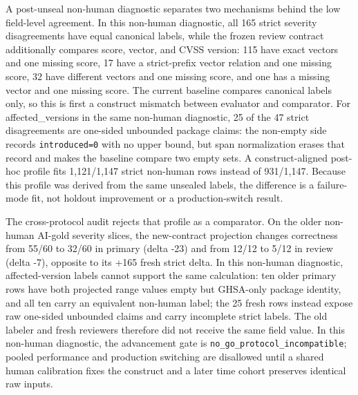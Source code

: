 A post-unseal non-human diagnostic separates two mechanisms behind the low field-level agreement. In this non-human diagnostic, all 165 strict severity disagreements have equal canonical labels, while the frozen review contract additionally compares score, vector, and CVSS version: 115 have exact vectors and one missing score, 17 have a strict-prefix vector relation and one missing score, 32 have different vectors and one missing score, and one has a missing vector and one missing score. The current baseline compares canonical labels only, so this is first a construct mismatch between evaluator and comparator. For affected\_versions in the same non-human diagnostic, 25 of the 47 strict disagreements are one-sided unbounded package claims: the non-empty side records \texttt{introduced=0} with no upper bound, but span normalization erases that record and makes the baseline compare two empty sets. A construct-aligned post-hoc profile fits 1,121/1,147 strict non-human rows instead of 931/1,147. Because this profile was derived from the same unsealed labels, the difference is a failure-mode fit, not holdout improvement or a production-switch result.

The cross-protocol audit rejects that profile as a comparator. On the older non-human AI-gold severity slices, the new-contract projection changes correctness from 55/60 to 32/60 in primary (delta -23) and from 12/12 to 5/12 in review (delta -7), opposite to its +165 fresh strict delta. In this non-human diagnostic, affected-version labels cannot support the same calculation: ten older primary rows have both projected range values empty but GHSA-only package identity, and all ten carry an equivalent non-human label; the 25 fresh rows instead expose raw one-sided unbounded claims and carry incomplete strict labels. The old labeler and fresh reviewers therefore did not receive the same field value. In this non-human diagnostic, the advancement gate is \texttt{no\_go\_protocol\_incompatible}; pooled performance and production switching are disallowed until a shared human calibration fixes the construct and a later time cohort preserves identical raw inputs.

